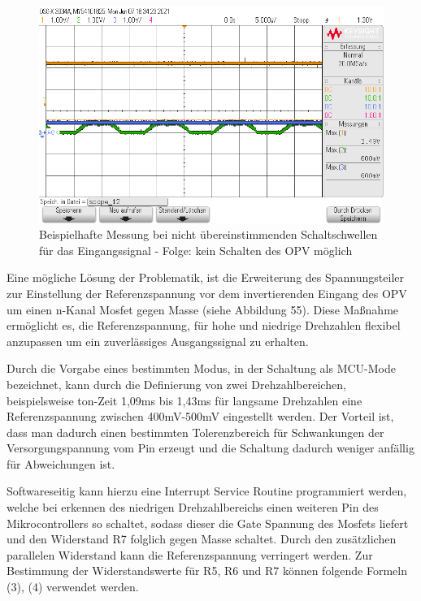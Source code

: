 \begin{figure}[H] %
\includegraphics[width=.95\textwidth]{sec4/images/Problematik_stop_throttle} 
\centering
\captionsetup{width=.95\textwidth}
\caption[Problematik\_stop\_throttle]{Beispielhafte Messung bei nicht übereinstimmenden Schaltschwellen für das Eingangssignal - Folge: kein Schalten des OPV möglich }\centering
\label{fig:ProblematikStopThrottle}
\end{figure}

Eine mögliche Lösung der Problematik, ist die Erweiterung des Spannungsteiler zur Einstellung der Referenzspannung vor dem invertierenden Eingang des OPV um einen n-Kanal Mosfet gegen Masse (siehe Abbildung 55). Diese Maßnahme ermöglicht es, die Referenzspannung, für hohe und niedrige Drehzahlen flexibel anzupassen um ein zuverlässiges Ausgangssignal zu erhalten.\vspace{11pt}

Durch die Vorgabe eines bestimmten Modus, in der Schaltung als MCU-Mode bezeichnet, kann durch die Definierung von zwei Drehzahlbereichen, beispielsweise ton-Zeit 1,09ms bis 1,43ms für langsame Drehzahlen eine Referenzspannung zwischen 400mV-500mV eingestellt werden. Der Vorteil ist, dass man dadurch einen bestimmten Tolerenzbereich für Schwankungen der Versorgungspannung vom Pin erzeugt und die Schaltung dadurch weniger anfällig für Abweichungen ist.\vspace{11pt}

Softwareseitig kann hierzu eine Interrupt Service Routine programmiert werden, welche bei erkennen des niedrigen Drehzahlbereichs einen weiteren Pin des Mikrocontrollers so schaltet, sodass dieser die Gate Spannung des Mosfets liefert und den Widerstand R7 folglich gegen Masse schaltet. Durch den zusätzlichen parallelen Widerstand kann die Referenzspannung verringert werden. Zur Bestimmung der Widerstandswerte für R5, R6 und R7 können folgende Formeln (3), (4) verwendet werden.\vspace{11pt}

